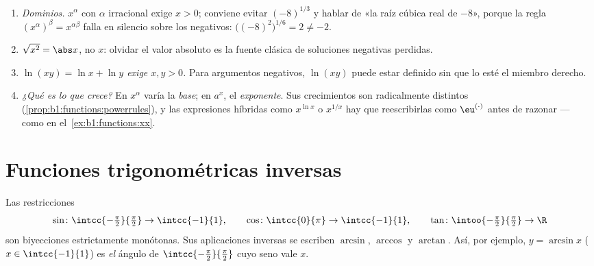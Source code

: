 \begin{remark}\label{rem:b1:functions:pitfalls}
\begin{enumerate}
  \item \emph{Dominios.} $x^\alpha$ con $\alpha$ irracional exige
        $x > 0$; conviene evitar $(-8)^{1/3}$ y hablar de «la raíz
        cúbica real de $-8$», porque la regla
        $(x^\alpha)^\beta = x^{\alpha\beta}$ falla en silencio sobre
        los negativos: $\bigl((-8)^2\bigr)^{1/6} = 2 \neq -2$.
  \item \emph{$\sqrt{x^2} = \abs x$}, no $x$: olvidar el valor absoluto
        es la fuente clásica de soluciones negativas perdidas.
  \item \emph{$\ln(xy) = \ln x + \ln y$ exige $x, y > 0$.} Para
        argumentos negativos, $\ln(xy)$ puede estar definido sin que lo
        esté el miembro derecho.
  \item \emph{¿Qué es lo que crece?} En $x^\alpha$ varía la
        \emph{base}; en $a^x$, el \emph{exponente}. Sus crecimientos
        son radicalmente distintos
        (\cref{prop:b1:functions:powerrules}), y las expresiones
        híbridas como $x^{\ln x}$ o $x^{1/x}$ hay que reescribirlas
        como $\eu^{(\cdot)}$ antes de razonar --- como en
        el~\cref{ex:b1:functions:xx}.
\end{enumerate}
\end{remark}

\section{Funciones trigonométricas inversas}

\begin{definition}[$\arcsin$, $\arccos$, $\arctan$]\label{def:b1:functions:arc}
Las restricciones
\[
\sin \colon \intcc{-\tfrac\pi2}{\tfrac\pi2} \to \intcc{-1}{1},
\qquad
\cos \colon \intcc{0}{\pi} \to \intcc{-1}{1},
\qquad
\tan \colon \intoo{-\tfrac\pi2}{\tfrac\pi2} \to \R
\]
son biyecciones estrictamente monótonas. Sus aplicaciones inversas se
escriben $\arcsin$, $\arccos$ y
$\arctan$. Así, por ejemplo, $y = \arcsin x$
($x \in \intcc{-1}{1}$) es \emph{el} ángulo de
$\intcc{-\frac\pi2}{\frac\pi2}$ cuyo seno vale $x$.
\end{definition}

